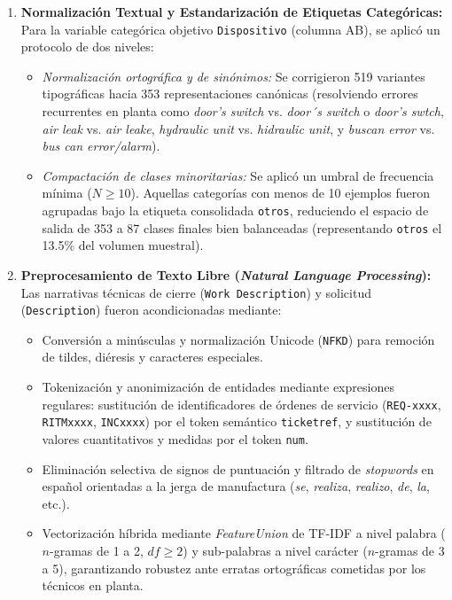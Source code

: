 \documentclass[conference]{IEEEtran}
\begin{document}
\begin{enumerate}
    \item \textbf{Normalización Textual y Estandarización de Etiquetas Categóricas:}
    Para la variable categórica objetivo \texttt{Dispositivo} (columna AB), se aplicó un protocolo de dos niveles:
    \begin{itemize}
        \item \textit{Normalización ortográfica y de sinónimos:} Se corrigieron 519 variantes tipográficas hacia 353 representaciones canónicas (resolviendo errores recurrentes en planta como \textit{door's switch} vs. \textit{door´s switch} o \textit{door's swtch}, \textit{air leak} vs. \textit{air leake}, \textit{hydraulic unit} vs. \textit{hidraulic unit}, y \textit{buscan error} vs. \textit{bus can error/alarm}).
        \item \textit{Compactación de clases minoritarias:} Se aplicó un umbral de frecuencia mínima ($N \ge 10$). Aquellas categorías con menos de 10 ejemplos fueron agrupadas bajo la etiqueta consolidada \texttt{otros}, reduciendo el espacio de salida de 353 a 87 clases finales bien balanceadas (representando \texttt{otros} el 13.5\% del volumen muestral).
    \end{itemize}

    \item \textbf{Preprocesamiento de Texto Libre (\textit{Natural Language Processing}):}
    Las narrativas técnicas de cierre (\texttt{Work Description}) y solicitud (\texttt{Description}) fueron acondicionadas mediante:
    \begin{itemize}
        \item Conversión a minúsculas y normalización Unicode (\texttt{NFKD}) para remoción de tildes, diéresis y caracteres especiales.
        \item Tokenización y anonimización de entidades mediante expresiones regulares: sustitución de identificadores de órdenes de servicio (\texttt{REQ-xxxx}, \texttt{RITMxxxx}, \texttt{INCxxxx}) por el token semántico \texttt{ticketref}, y sustitución de valores cuantitativos y medidas por el token \texttt{num}.
        \item Eliminación selectiva de signos de puntuación y filtrado de \textit{stopwords} en español orientadas a la jerga de manufactura (\textit{se}, \textit{realiza}, \textit{realizo}, \textit{de}, \textit{la}, etc.).
        \item Vectorización híbrida mediante \textit{FeatureUnion} de TF-IDF a nivel palabra ($n$-gramas de 1 a 2, $df \ge 2$) y sub-palabras a nivel carácter ($n$-gramas de 3 a 5), garantizando robustez ante erratas ortográficas cometidas por los técnicos en planta.
    \end{itemize}
\end{enumerate}
\end{document}
